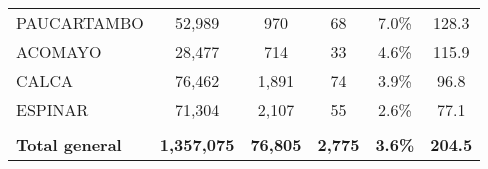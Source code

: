 \begin{tabular}{lccccc}
	\cellcolor[HTML]{FFE699}PAUCARTAMBO                             & 52,989               & 970                        & 68                   & 7.0\%                      & 128.3                                       \\
	\cellcolor[HTML]{FFE699}ACOMAYO                                 & 28,477               & 714                        & 33                   & 4.6\%                      & 115.9                                       \\
	\cellcolor[HTML]{FFE699}CALCA                                   & 76,462               & 1,891                      & 74                   & 3.9\%                      & 96.8                                        \\
	\cellcolor[HTML]{FFE699}ESPINAR                                 & 71,304               & 2,107                      & 55                   & 2.6\%                      & 77.1                                        \\
	& \multicolumn{1}{l}{} & \multicolumn{1}{l}{}       & \multicolumn{1}{l}{} & \multicolumn{1}{l}{}       & \multicolumn{1}{l}{}                        \\
	\rowcolor[HTML]{DDEBF7} 
	\textbf{Total general}                                          & \textbf{1,357,075}   & \textbf{76,805}            & \textbf{2,775}       & \textbf{3.6\%}             & \textbf{204.5}                             
\end{tabular}